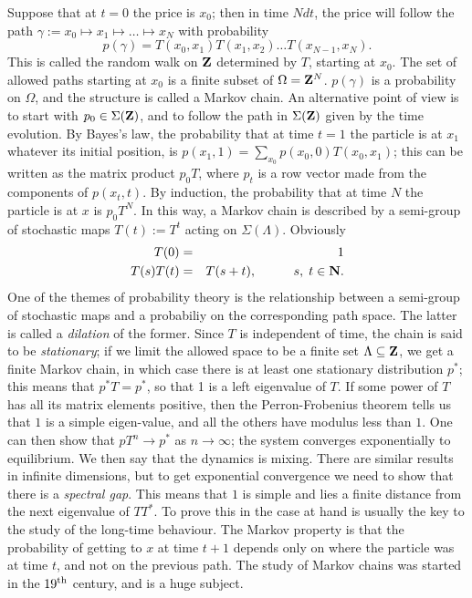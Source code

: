 Suppose that at $t=0$ the price is $x_0$; then in time $Ndt$, the
price will follow the path $\gamma:=x_0\mapsto x_1\mapsto\ldots\mapsto x_N$
with probability 
\begin{equation}
p(\gamma)=T(x_0,x_1)T(x_1,x_2)\ldots T(x_{N-1},x_N).
\label{path}
\end{equation}
This is
called the random walk on ${\bf Z}$ determined by $T$, starting at $x_0$.
The set of allowed paths starting at $x_0$ is a finite subset of
$\Omega={\bf Z}^N$. $p(\gamma)$ is a probability on $\Omega$, and
the structure is called a Markov chain. An alternative point of view is to
start with $p_0\in\Sigma({\bf Z})$,
and to follow the path in $\Sigma({\bf Z})$ given by the time evolution.
By Bayes's law, the probability that at time $t=1$ the particle is at $x_1$
whatever its initial position, is
$p(x_1,1)=\sum_{x_0}p(x_0,0)T(x_0,x_1)$; this can be written as the matrix
product $p_0T$, where $p_t$ is a row vector made from the components of
$p(x_t,t)$.
By induction, the probability that at time $N$ the particle is at $x$
is $p_0T^N$. In this way, a Markov chain is described by a semi-group
of stochastic maps $T(t):=T^t$ acting on $\Sigma(\Lambda)$. Obviously
\begin{eqnarray}
T(0)&=&1\\
T(s)T(t)&=&T(s+t),\hspace{.4in} s,\;t\in {\bf N}.
\end{eqnarray}
One of the themes of probability theory is the relationship between a
semi-group of stochastic maps and a probabiliy on the corresponding
path space. The latter is called a {\em dilation} of the former.
Since $T$ is independent of time, the chain is said to be {\em
stationary}; if we limit the allowed space to be a finite set $\Lambda
\subseteq{\bf Z}$, we get a finite Markov chain, in which case
there is at least one stationary distribution $p^*$; this means that
$p^*T=p^*$, so that 1 is a left eigenvalue of $T$. If some power of $T$
has all its matrix elements positive, then the Perron-Frobenius theorem
tells us that $1$ is a simple eigen-value, and all the others have
modulus less than $1$. One can then show that $pT^n\rightarrow p^*$
as $n\rightarrow\infty$; the system converges exponentially
to equilibrium. We then say that the dynamics is mixing.
There are similar results in infinite dimensions, but
to get exponential convergence we need to show that there is a {\em
spectral gap}. This means that $1$ is simple and lies a finite distance
from the next eigenvalue of $TT^*$. To prove this in the case at hand is
usually the key to the study of the long-time behaviour. 
The Markov property is
that the probability of getting to $x$ at time $t+1$ depends only on
where the particle was at time $t$, and not on the previous path.
The study of Markov chains was started in the $19^{\rm th}$ century,
and is a huge subject.

